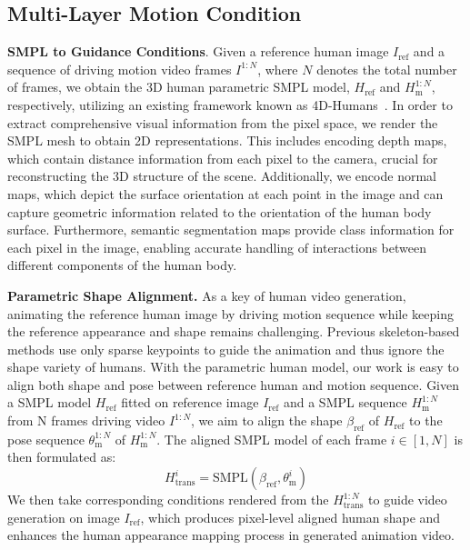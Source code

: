 \subsection{Multi-Layer Motion Condition}
\label{subsec:condition}

\textbf{SMPL to Guidance Conditions}. 
Given a reference human image $I_\text{ref}$ and a sequence of driving motion video frames $I^{1:N}$, where $N$ denotes the total number of frames, we obtain the 3D human parametric SMPL model, $H_\text{ref}$ and $H_\text{m}^{1:N}$,  respectively, utilizing an existing framework known as 4D-Humans~\cite{goel2023humans}.
In order to extract comprehensive visual information from the pixel space, we render the SMPL mesh to obtain 2D representations. 
This includes encoding depth maps, which contain distance information from each pixel to the camera, crucial for reconstructing the 3D structure of the scene. 
Additionally, we encode normal maps, which depict the surface orientation at each point in the image and can capture geometric information related to the orientation of the human body surface. 
Furthermore, semantic segmentation maps provide class information for each pixel in the image, enabling accurate handling of interactions between different components of the human body.

\textbf{Parametric Shape Alignment.}
As a key of human video generation, animating the reference human image by driving motion sequence while keeping the reference appearance and shape remains challenging. 
Previous skeleton-based methods use only sparse keypoints to guide the animation and thus ignore the shape variety of humans. 
With the parametric human model, our work is easy to align both shape and pose between reference human and motion sequence. 
Given a SMPL model $H_\text{ref}$ fitted on reference image $I_\text{ref}$ and a SMPL sequence $H_\text{m}^{1:N}$ from N frames driving video $I^{1:N}$, we aim to align the shape $\beta_\text{ref}$ of  $H_\text{ref}$ to the pose sequence $\theta_\text{m}^{1:N}$ of $H_\text{m}^{1:N}$. The aligned SMPL model of each frame $i \in [1, N] $ is then formulated as:
 \begin{equation}
    H_\text{trans}^{i} = \text{SMPL}(\beta_\text{ref}, \theta_\text{m}^{i} )
\end{equation}
We then take corresponding conditions rendered from the $H_\text{trans}^{1:N}$ to guide video generation on image $I_\text{ref}$, which produces pixel-level aligned human shape and enhances the human appearance mapping process in generated animation video.

